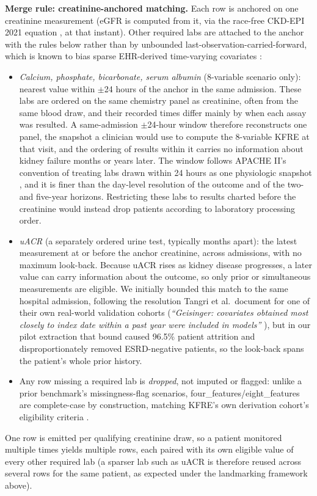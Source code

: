 \textbf{Merge rule: creatinine-anchored matching.} Each row is anchored on one creatinine measurement (eGFR is computed from it, via the race-free CKD-EPI 2021 equation \citep{inker2021ckdepi}, at that instant). Other required labs are attached to the anchor with the rules below rather than by unbounded last-observation-carried-forward, which is known to bias sparse EHR-derived time-varying covariates \citep{hu2022locf_bias}:
\begin{itemize}
    \item \textit{Calcium, phosphate, bicarbonate, serum albumin} (8-variable scenario only): nearest value within $\pm$24 hours of the anchor in the same admission. These labs are ordered on the same chemistry panel as creatinine, often from the same blood draw, and their recorded times differ mainly by when each assay was resulted. A same-admission $\pm$24-hour window therefore reconstructs one panel, the snapshot a clinician would use to compute the 8-variable KFRE at that visit, and the ordering of results within it carries no information about kidney failure months or years later. The window follows APACHE II's convention of treating labs drawn within 24 hours as one physiologic snapshot \citep{knaus1985apacheii}, and it is finer than the day-level resolution of the outcome and of the two- and five-year horizons. Restricting these labs to results charted before the creatinine would instead drop patients according to laboratory processing order.
    \item \textit{uACR} (a separately ordered urine test, typically months apart): the latest measurement at or before the anchor creatinine, across admissions, with no maximum look-back. Because uACR rises as kidney disease progresses, a later value can carry information about the outcome, so only prior or simultaneous measurements are eligible. We initially bounded this match to the same hospital admission, following the resolution Tangri et al.\ document for one of their own real-world validation cohorts (\textit{``Geisinger: covariates obtained most closely to index date within a past year were included in models''} \citep{tangri2016multinational}), but in our pilot extraction that bound caused 96.5\% patient attrition and disproportionately removed ESRD-negative patients, so the look-back spans the patient's whole prior history.
    \item Any row missing a required lab is \emph{dropped}, not imputed or flagged: unlike a prior benchmark's missingness-flag scenarios, four\_features/eight\_features are complete-case by construction, matching KFRE's own derivation cohort's eligibility criteria \citep{tangri2011predicting}.
\end{itemize}
One row is emitted per qualifying creatinine draw, so a patient monitored multiple times yields multiple rows, each paired with its own eligible value of every other required lab (a sparser lab such as uACR is therefore reused across several rows for the same patient, as expected under the landmarking framework above).

